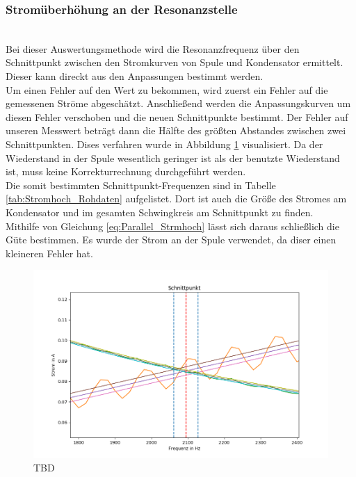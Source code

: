 \documentclass[12pt,a4paper]{article}
\begin{document}
\subsubsection{Stromüberhöhung an der Resonanzstelle}\mbox{}\\
Bei dieser Auswertungsmethode wird die Resonanzfrequenz über den Schnittpunkt zwischen den Stromkurven von Spule und Kondensator ermittelt. Dieser kann direckt aus den Anpassungen bestimmt werden.\\
Um einen Fehler auf den Wert zu bekommen, wird zuerst ein Fehler auf die gemessenen Ströme abgeschätzt. Anschließend werden die Anpassungskurven um diesen Fehler verschoben und die neuen Schnittpunkte bestimmt. Der Fehler auf unseren Messwert beträgt dann die Hälfte des größten Abstandes zwischen zwei Schnittpunkten. Dises verfahren wurde in Abbildung \ref{fig:parallel_Stromhoch} visualisiert.
Da der Wiederstand in der Spule wesentlich geringer ist als der benutzte Wiederstand ist, muss keine Korrekturrechnung durchgeführt werden.\\
Die somit bestimmten Schnittpunkt-Frequenzen sind in Tabelle \ref{tab:Stromhoch_Rohdaten} aufgelistet. Dort ist auch die Größe des Stromes am Kondensator und im gesamten Schwingkreis am Schnittpunkt zu finden. \\
Mithilfe von Gleichung \ref{eq:Parallel_Strmhoch} lässt sich daraus schließlich die Güte bestimmen. Es wurde der Strom an der Spule verwendet, da diser einen kleineren Fehler hat.

\begin{figure}
\centering
\includegraphics[scale=0.7]{Bilder/Parallel_Stromhoch.png}
\caption{TBD}
\label{fig:parallel_Stromhoch}
\end{figure}
\end{document}
